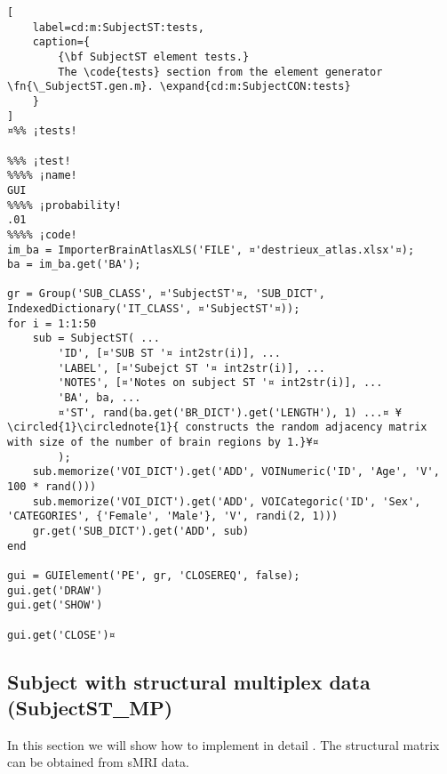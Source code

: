 \documentclass{tufte-handout}
\begin{document}
\begin{lstlisting}[
	label=cd:m:SubjectST:tests,
	caption={
		{\bf SubjectST element tests.}
		The \code{tests} section from the element generator \fn{\_SubjectST.gen.m}. \expand{cd:m:SubjectCON:tests}
	}
]
¤%% ¡tests!

%%% ¡test!
%%%% ¡name!
GUI
%%%% ¡probability!
.01
%%%% ¡code!
im_ba = ImporterBrainAtlasXLS('FILE', ¤'destrieux_atlas.xlsx'¤);
ba = im_ba.get('BA');

gr = Group('SUB_CLASS', ¤'SubjectST'¤, 'SUB_DICT', IndexedDictionary('IT_CLASS', ¤'SubjectST'¤));
for i = 1:1:50
    sub = SubjectST( ...
        'ID', [¤'SUB ST '¤ int2str(i)], ...
        'LABEL', [¤'Subejct ST '¤ int2str(i)], ...
        'NOTES', [¤'Notes on subject ST '¤ int2str(i)], ...
        'BA', ba, ...
        ¤'ST', rand(ba.get('BR_DICT').get('LENGTH'), 1) ...¤ ¥\circled{1}\circlednote{1}{ constructs the random adjacency matrix with size of the number of brain regions by 1.}¥¤
        );
    sub.memorize('VOI_DICT').get('ADD', VOINumeric('ID', 'Age', 'V', 100 * rand()))
    sub.memorize('VOI_DICT').get('ADD', VOICategoric('ID', 'Sex', 'CATEGORIES', {'Female', 'Male'}, 'V', randi(2, 1)))
    gr.get('SUB_DICT').get('ADD', sub)
end

gui = GUIElement('PE', gr, 'CLOSEREQ', false);
gui.get('DRAW')
gui.get('SHOW')

gui.get('CLOSE')¤
\end{lstlisting}

\clearpage

\subsection{Subject with structural multiplex data (SubjectST\_MP)}

In this section we will show how to implement in detail . The structural matrix can be obtained from sMRI data.
\end{document}
